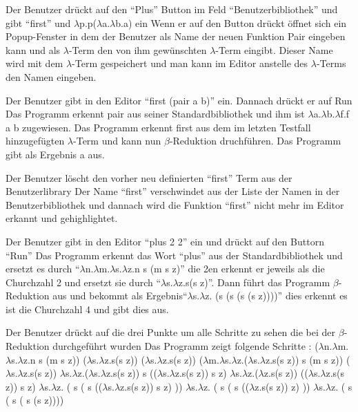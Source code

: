 \documentclass[parskip=full,11pt,twoside]{scrartcl}
\begin{document}
{Der Benutzer drückt auf den \enquote{Plus} Button im Feld \enquote{Benutzerbibliothek} und gibt \enquote {first} und $\lambda$p.p($\lambda$a.$\lambda$b.a) ein}
{Wenn er auf den Button drückt öffnet sich ein Popup-Fenster in dem der Benutzer als Name der neuen Funktion Pair eingeben kann und als $\lambda$-Term den von ihm gewünschten $\lambda$-Term eingibt. Dieser Name wird mit dem $\lambda$-Term gespeichert und man kann im Editor anstelle des $\lambda$-Terms den Namen eingeben.}

{ Der Benutzer gibt in den Editor \enquote {first (pair a b)} ein. Dannach drückt er auf Run}
{ Das Programm erkennt pair aus seiner Standardbibliothek und ihm ist $\lambda$a.$\lambda$b.$\lambda$f.f a b  zugewiesen. Das Programm erkennt first aus dem im letzten Testfall hinzugefügten $\lambda$-Term und kann nun $\beta$-Reduktion druchführen. Das Programm gibt als Ergebnis a aus.}

{Der Benutzer löscht den vorher neu definierten \enquote{first} Term aus der Benutzerlibrary}
{Der Name \enquote{first} verschwindet aus der Liste der Namen in der Benutzerbibliothek und dannach wird die Funktion \enquote{first} nicht mehr im Editor erkannt und gehighlightet.}

{Der Benutzer gibt in den Editor \enquote {plus 2 2} ein und drückt auf den Buttorn \enquote {Run}}
{ Das Programm erkennt das Wort \enquote {plus} aus der Standardbibliothek und ersetzt es durch \enquote {$\lambda$n.$\lambda$m.$\lambda$s.$\lambda$z.n s (m s z)} die 2en erkennt er jeweils als die Churchzahl 2 und ersetzt sie durch \enquote {$\lambda$s.$\lambda$z.s(s z)}. Dann führt das Programm $\beta$-Reduktion aus und bekommt als Ergebnis\enquote {$\lambda$s.$\lambda$z. (s (s (s (s z))))} dies erkennt es ist die Churchzahl 4 und gibt dies aus. }


{ Der Benutzer drückt auf die drei Punkte um alle Schritte zu sehen die bei der $\beta$-Reduktion durchgeführt wurden }
{ Das Programm zeigt folgende Schritte :
	\newline ($\lambda$n.$\lambda$m.$\lambda$s.$\lambda$z.n s (m s z)) ($\lambda$s.$\lambda$z.s(s z)) ($\lambda$s.$\lambda$z.s(s z))
	\newline ($\lambda$m.$\lambda$s.$\lambda$z.($\lambda$s.$\lambda$z.s(s z)) s (m s z)) ($\lambda$s.$\lambda$z.s(s z))
	\newline $\lambda$s.$\lambda$z.($\lambda$s.$\lambda$z.s(s z)) s (($\lambda$s.$\lambda$z.s(s z)) s z)
	\newline $\lambda$s.$\lambda$z.($\lambda$z.s(s z)) (($\lambda$s.$\lambda$z.s(s z)) s z)
	\newline $\lambda$s.$\lambda$z. ( s ( s (($\lambda$s.$\lambda$z.s(s z)) s z) ))
	\newline $\lambda$s.$\lambda$z. ( s ( s (($\lambda$z.s(s z)) z) ))
	\newline $\lambda$s.$\lambda$z. ( s ( s ( s (s z))))}
\end{document}
